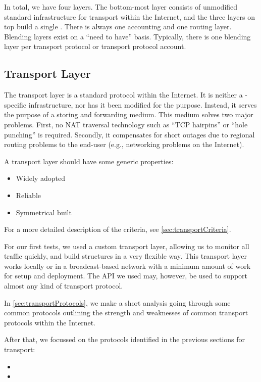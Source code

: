 In total, we have four layers. The bottom-most layer consists of unmodified standard infrastructure for transport within the Internet, and the three layers on top build a single \VortexNode. There is always one accounting and one routing layer. Blending layers exist on a ``need to have'' basis. Typically, there is one blending layer per transport protocol or transport protocol account.

\subsection{Transport Layer}
The transport layer is a standard protocol within the Internet. It is neither a \MessageVortex{}-specific infrastructure, nor has it been modified for the purpose. Instead, it serves the purpose of a storing and forwarding medium. This medium solves two major problems. First, no NAT traversal technology such as ``TCP hairpins'' or ``hole punching'' is required. Secondly, it compensates for short outages due to regional routing problems to the end-user (e.g., networking problems on the Internet).

A transport layer should have some generic properties:
\begin{itemize}
	\item Widely adopted 
	\item Reliable
	\item Symmetrical built 
\end{itemize}

For a more detailed description of the criteria, see \cref{sec:transportCriteria}.

For our first tests, we used a custom transport layer, allowing us to monitor all traffic quickly, and build structures in a very flexible way. This transport layer works locally or in a broadcast-based network with a minimum amount of work for setup and deployment. The API we used may, however, be used to support almost any kind of transport protocol.

In \cref{sec:transportProtocols}, we make a short analysis going through some common protocols outlining the strength and weaknesses of common transport protocols within the Internet.

After that, we focussed on the protocols identified in the previous sections for transport:
\begin{itemize}
	\item {}
	\item {}
\end{itemize}

